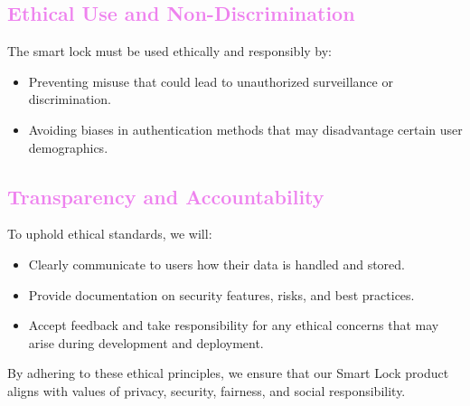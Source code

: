 \textcolor{violet}{\subsection*{Ethical Use and Non-Discrimination}}
The smart lock must be used ethically and responsibly by:
\begin{itemize}
    \item Preventing misuse that could lead to unauthorized surveillance or discrimination.
    \item Avoiding biases in authentication methods that may disadvantage certain user demographics.
\end{itemize}

\textcolor{violet}{\subsection*{Transparency and Accountability}}
To uphold ethical standards, we will:
\begin{itemize}
    \item Clearly communicate to users how their data is handled and stored.
    \item Provide documentation on security features, risks, and best practices.
    \item Accept feedback and take responsibility for any ethical concerns that may arise during development and deployment.
\end{itemize}

By adhering to these ethical principles, we ensure that our Smart Lock product aligns with values of privacy, security, fairness, and social responsibility.
